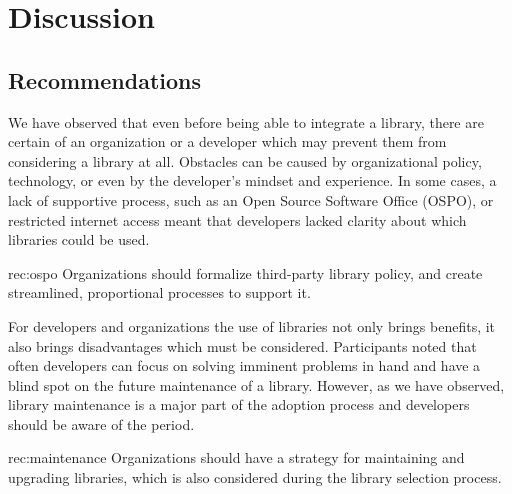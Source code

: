 
\section{Discussion}

\subsection{Recommendations}

We have observed that even before being able to integrate a library, there are certain   of an organization or a developer which may prevent them from considering a library at all. Obstacles can be caused by organizational policy, technology, or even by the developer's mindset and experience. In some cases, a lack of supportive process, such as an Open Source Software Office (OSPO), or restricted internet access meant that developers lacked clarity about which libraries could be used. 
\begin{recommendation}{rec:ospo}
  {Organizations should formalize 
third-party library policy, and create streamlined, proportional processes to support it.}
\end{recommendation}\medskip

For developers and organizations the use of libraries not only brings benefits, it also brings disadvantages which must be considered. Participants noted that often developers can focus on solving imminent problems in hand and have a blind spot on the future maintenance of a library. However, as we have observed, library maintenance is a major part of the adoption process and developers should be aware of the  period. 
\begin{recommendation}{rec:maintenance}
  {Organizations should have a strategy for maintaining and upgrading libraries, which is also considered during the library selection process.}
\end{recommendation}\medskip

